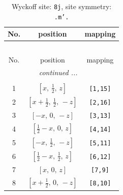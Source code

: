 \documentclass[fleqn,8pt]{jsarticle}
\begin{document}
\begin{longtable}{ccc}
\caption{Wyckoff site: {\tt 8j}, site symmetry: {\tt .m'.}}
 \\
 \hline \hline
No. & position & mapping \\ \hline \endfirsthead

\multicolumn{2}{l}{\tablename\ \thetable{}} \\
 \hline \hline
No. & position & mapping \\ \hline \endhead

 \hline \hline
\multicolumn{2}{r}{\footnotesize\it continued ...} \\ \endfoot

 \hline \hline
\multicolumn{2}{r}{} \\ \endlastfoot

1 & $\left[ x,\, \frac{1}{2},\, z \right]$ & {\tt [1,15]} \\ \hline
2 & $\left[ x + \frac{1}{2},\, \frac{1}{2},\, - z \right]$ & {\tt [2,16]} \\ \hline
3 & $\left[ - x,\, 0,\, - z \right]$ & {\tt [3,13]} \\ \hline
4 & $\left[ \frac{1}{2} - x,\, 0,\, z \right]$ & {\tt [4,14]} \\ \hline
5 & $\left[ - x,\, \frac{1}{2},\, - z \right]$ & {\tt [5,11]} \\ \hline
6 & $\left[ \frac{1}{2} - x,\, \frac{1}{2},\, z \right]$ & {\tt [6,12]} \\ \hline
7 & $\left[ x,\, 0,\, z \right]$ & {\tt [7,9]} \\ \hline
8 & $\left[ x + \frac{1}{2},\, 0,\, - z \right]$ & {\tt [8,10]} \\
\end{longtable}
\renewcommand{\arraystretch}{1.2}
\end{document}
